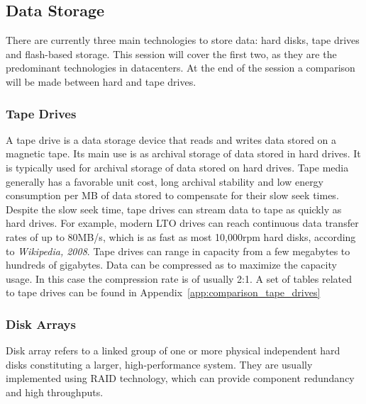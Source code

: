         \subsection{Data Storage} \label{sec2:data_storage}
            There are currently three main technologies to store data: hard disks, tape drives and flash-based storage. This session will cover the first two, as they are the predominant technologies in datacenters. At the end of the session a comparison will be made between hard and tape drives.
            
            \subsubsection*{Tape Drives}
                A tape drive is a data storage device that reads and writes data stored on a magnetic tape. Its main use is as archival storage of data stored in hard drives. It is typically used for archival storage of data stored on hard drives. 
Tape media generally has a favorable unit cost, long archival stability and low energy consumption per MB of data stored to compensate for their slow seek times. Despite the slow seek time, tape drives can stream data to tape as quickly as hard drives. For example, modern LTO drives can reach continuous data transfer rates of up to 80MB/s, which is as fast as most 10,000rpm hard disks, according to \emph{Wikipedia, 2008}. Tape drives can range in capacity from a few megabytes to hundreds of gigabytes. Data can be compressed as to maximize the capacity usage. In this case the compression rate is of usually 2:1. A set of tables related to tape drives can be found in Appendix~\ref{app:comparison_tape_drives}
            
            \subsubsection*{Disk Arrays}
                Disk array refers to a linked group of one or more physical independent hard disks constituting a larger, high-performance system. They are usually implemented using RAID technology, which can provide component redundancy and high throughputs.
        
